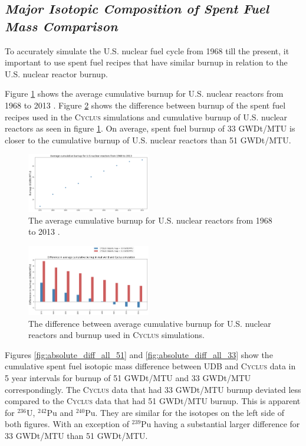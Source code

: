 \documentclass{anstrans}
\newcommand{\Cyclus}{\textsc{Cyclus}\xspace}%
\begin{document}
\subsection{\textit{Major Isotopic Composition of  Spent Fuel Mass Comparison}}
To accurately simulate the U.S. nuclear fuel cycle from 1968 till the present, it important to use spent fuel recipes that have similar burnup in relation to the U.S. nuclear reactor burnup. 

Figure \ref{fig:burn_up_real} shows the average cumulative burnup for U.S. nuclear reactors from 1968 to 2013 \cite{eia_spent_2015}. Figure \ref{fig:burn_up_difference} shows the difference between burnup of the spent fuel recipes used in the \Cyclus simulations and cumulative burnup of U.S. nuclear reactors as seen in figure \ref{fig:burn_up_real}. On average, spent fuel burnup of 33 GWDt/MTU is closer to the cumulative burnup of U.S. nuclear reactors than 51 GWDt/MTU. 

\begin{figure}[t] %
	\centering
	\includegraphics[width=0.48\textwidth]{figures/burn_up_real}
	\caption{The average cumulative burnup for U.S. nuclear reactors from 1968 to 2013 \cite{eia_spent_2015}.}
	\label{fig:burn_up_real}
\end{figure} 

\begin{figure}[t] %
	\centering
	\includegraphics[width=0.48\textwidth]{figures/burn_up_difference}
	\caption{The difference between average cumulative burnup for U.S. nuclear reactors and burnup used in \Cyclus simulations.}
	\label{fig:burn_up_difference}
\end{figure} 

Figures \ref{fig:absolute_diff_all_51} and \ref{fig:absolute_diff_all_33} show the cumulative spent fuel isotopic mass difference between UDB and \Cyclus data in 5 year intervals for burnup of 51 GWDt/MTU and 33 GWDt/MTU correspondingly. The \Cyclus data that had 33 GWDt/MTU burnup deviated less compared to the \Cyclus data that had 51 GWDt/MTU burnup. This is apparent for $^{236}$U, $^{242}$Pu and $^{240}$Pu. They are similar for the isotopes on the left side of both figures. With an exception of $^{239}$Pu having a substantial larger difference for 33 GWDt/MTU than 51 GWDt/MTU. 
\end{document}
